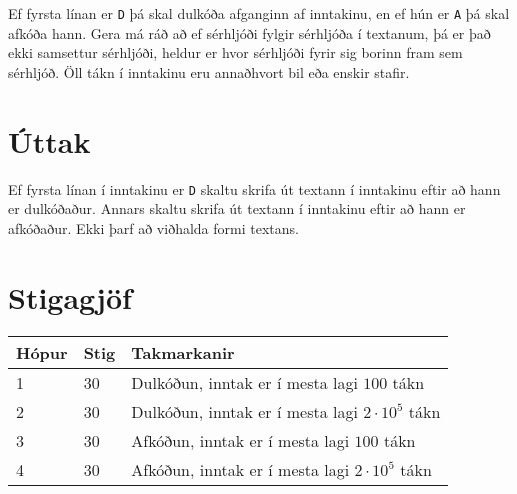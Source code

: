 Ef fyrsta línan er \texttt{D} þá skal dulkóða afganginn af inntakinu, en ef hún er \texttt{A} þá skal afkóða hann.
Gera má ráð að ef sérhljóði fylgir sérhljóða í textanum, þá er það ekki samsettur sérhljóði, heldur er hvor sérhljóði fyrir sig borinn fram sem sérhljóð.
Öll tákn í inntakinu eru annaðhvort bil eða enskir stafir.

\section*{Úttak}
Ef fyrsta línan í inntakinu er \texttt{D} skaltu skrifa út textann í inntakinu eftir að hann er dulkóðaður.
Annars skaltu skrifa út textann í inntakinu eftir að hann er afkóðaður.
Ekki þarf að viðhalda formi textans.

\section*{Stigagjöf}
\begin{tabular}{|l|l|l|}
\hline
Hópur & Stig & Takmarkanir \\ \hline
1     & 30   & Dulkóðun, inntak er í mesta lagi $100$ tákn \\ \hline
2     & 30   & Dulkóðun, inntak er í mesta lagi $2 \cdot 10^5$ tákn \\ \hline
3     & 30   & Afkóðun, inntak er í mesta lagi $100$ tákn \\ \hline
4     & 30   & Afkóðun, inntak er í mesta lagi $2 \cdot 10^5$ tákn \\ \hline
\end{tabular}

